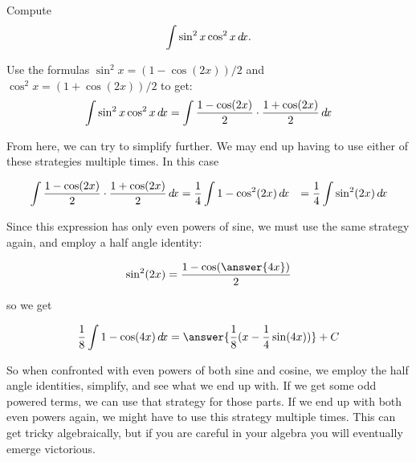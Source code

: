 \documentclass{ximera}
\begin{document}
\begin{example}
Compute 
\[
\int \sin^2x\cos^2x\mathop{}\!d\! x.
\]
\begin{explanation} 
Use the formulas
$\sin^2x =(1-\cos(2x))/2$ and $\cos^2x =(1+\cos(2x))/2$ to get:
\[
  \int \sin^2x\cos^2x\mathop{}\!d\! x=\int \frac{1-\cos(2x)}{2}\cdot
  \frac{1+\cos(2x)}{2}\mathop{}\!d\! x
\]

From here, we can try to simplify further.  We may end up having to use either of these strategies multiple times.  In this case

\begin{align*}
	\int \frac{1-\cos(2x)}{2} \cdot \frac{1+\cos(2x)}{2}\mathop{}\!d\! x &= \frac{1}{4} \int 1-\cos^2(2x) \mathop{}\!d\! x
		&= \frac{1}{4} \int \sin^2(2x) \mathop{}\!d\! x
\end{align*}

Since this expression has only even powers of sine, we must use the same strategy again, and employ a half angle identity:

\[
\sin^2(2x) = \frac{1-\cos(\answer{4x})}{2}
\]

so we get

\[
\frac{1}{8}\int 1-\cos(4x) \d x = \answer{\frac{1}{8}(x - \frac{1}{4}\sin(4x))} + C
\]
\end{explanation}

So when confronted with even powers of both sine and cosine, we employ the half angle identities, simplify, and see what we end up with.  If we get some odd powered terms, we can use that strategy for those parts.  If we end up with both even powers again, we might have to use this strategy multiple times.  This can get tricky algebraically, but if you are careful in your algebra you will eventually emerge victorious.
\end{example}
\end{document}
